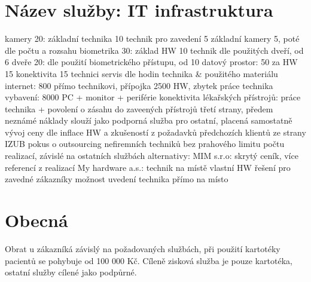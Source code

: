 \documentclass[11pt, a4paper, titlepage]{article}
\begin{document}
	\section*{Název služby: IT infrastruktura}
		kamery 20:
			základní technika 10
			technik pro zavedení 5
			základní kamery 5, poté dle počtu a rozsahu
		biometrika 30:
			základ HW 10
			technik dle použitých dveří, od 6
		dveře 20:
			dle použití biometrického přístupu, od 10
		datový prostor:
			50 za HW
			15 konektivita
			15 technici
			servis dle hodin technika \& použitého materiálu
		internet:
			800 přímo technikovi, přípojka 2500 HW, zbytek práce technika
		vybavení:
			8000 PC + monitor + periférie
		konektivita lékařských přístrojů:
			práce technika + povolení o zásahu do zaveených přístrojů třetí strany, předem neznámé náklady
		slouží jako podporná služba pro ostatní, placená samostatně
		vývoj ceny dle inflace HW a zkušeností z požadavků předchozích klientů
		ze strany IZUB pokus o outsourcing nefiremních techniků
		bez prahového limitu počtu realizací, závislé na ostatních službách
		alternativy:
			MIM s.r.o:
				skrytý ceník, více referencí z realizací
			My hardware a.s.:
				technik na místě
				vlastní HW řešení
		pro zavedné zákazníky možnost uvedení technika přímo na místo

	\section*{Obecná}
		Obrat u zákazníká závislý na požadovaných službách, při použití kartotéky pacientů se pohybuje od 100 000 Kč.
		Cíleně zisková služba je pouze kartotéka, ostatní služby cílené jako podpůrné.
\end{document}
